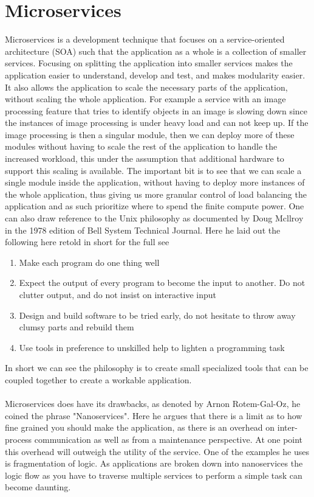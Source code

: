 \documentclass[../main.tex]{subfiles}
\begin{document}
\pagebreak\section{Microservices}
Microservices is a development technique that focuses on a service-oriented architecture (SOA) such that the application as a whole is a collection of smaller services. Focusing on splitting the application into smaller services makes the application easier to understand, develop and test, and makes modularity easier. It also allows the application to scale the necessary parts of the application, without scaling the whole application. For example a service with an image processing feature that tries to identify objects in an image is slowing down since the instances of image processing is under heavy load and can not keep up. If the image processing is then a singular module, then we can deploy more of these modules without having to scale the rest of the application to handle the increased workload, this under the assumption that additional hardware to support this scaling is available. The important bit is to see that we can scale a single module inside the application, without having to deploy more instances of the whole application, thus giving us more granular control of load balancing the application and as such prioritize where to spend the finite compute power. One can also draw reference to the Unix philosophy as documented by Doug Mcllroy in the 1978 edition of Bell System Technical Journal. Here he laid out the following here retold in short for the full see \cite[p. 8]{bell_unixphilosophy}
\begin{enumerate}
    \item Make each program do one thing well
    \item Expect the output of every program to become the input to another. Do not clutter output, and do not insist on interactive input
    \item Design and build software to be tried early, do not hesitate to throw away clumsy parts and rebuild them
    \item Use tools in preference to unskilled help to lighten a programming task
\end{enumerate}
In short we can see the philosophy is to create small specialized tools that can be coupled together to create a workable application.\\\\

Microservices does have its drawbacks, as denoted by Arnon Rotem-Gal-Oz, he coined the phrase "Nanoservices". \cite{nanoservices} Here he argues that there is a limit as to how fine grained you should make the application, as there is an overhead on inter-process communication as well as from a maintenance perspective. At one point this overhead will outweigh the utility of the service. One of the examples he uses is fragmentation of logic. As applications are broken down into nanoservices the logic flow as you have to traverse multiple services to perform a simple task can become daunting.
\end{document}

